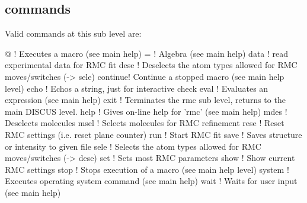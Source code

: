 \subsection*{commands}
Valid commands at this sub level are: 
\par
\begin{MacVerbatim}
@       ! Executes a macro (see main help)
=       ! Algebra (see main help)
data    ! read experimental data for RMC fit
dese    ! Deselects the atom types allowed for RMC moves/switches (-> sele)
continue! Continue a stopped macro (see main help level)
echo    ! Echos a string, just for interactive check
eval    ! Evaluates an expression (see main help)
exit    ! Terminates the rmc sub level, returns to the main DISCUS level.
help    ! Gives on-line help for 'rmc' (see main help)
mdes    ! Deselects molecules
msel    ! Selects molecules for RMC refinement
rese    ! Reset RMC settings (i.e. reset plane counter)
run     ! Start RMC fit
save    ! Saves structure or intensity to given file
sele    ! Selects the atom types allowed for RMC moves/switches (-> dese)
set     ! Sets most RMC parameters
show    ! Show current RMC settings
stop    ! Stops execution of a macro (see main help level)
system  ! Executes operating system command (see main help)
wait    ! Waits for user input (see main help)
\end{MacVerbatim}
